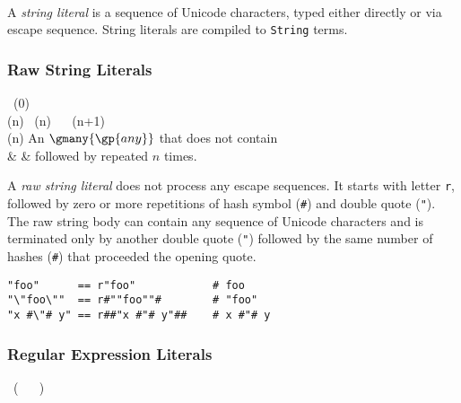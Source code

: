 \begin{bnf}
   \eq {} \  \ 
\end{bnf}

A \emph{string literal} is a sequence of Unicode characters, typed either directly or via escape sequence. String literals are compiled to \lstinline{String} terms.

\subsubsection*{Raw String Literals}

\begin{bnf}
        \eq {} \ (0) \\
  (n)  \eq    {} \ (n) \ 
                      \gorln \term{\#} \ (n+1) \ \term{\#} \\
  (n) \eq \textnormal{An \(\gmany{\gp{any}}\) that does not contain} \\
                      & & \textnormal{ followed by \term{\#} repeated \(n\) times.}
\end{bnf}

A \emph{raw string literal} does not process any escape sequences. It starts with letter \texttt{r}, followed by zero or more repetitions of hash symbol (\texttt{\#}) and double quote (\texttt{"}). The raw string body can contain any sequence of Unicode characters and is terminated only by another double quote (\texttt{"}) followed by the same number of hashes (\texttt{\#}) that proceeded the opening quote.

\begin{example}
\begin{lstlisting}[language=intentio]
"foo"      == r"foo"            # foo
"\"foo\""  == r#""foo""#        # "foo"
"x #\"# y" == r##"x #"# y"##    # x #"# y
\end{lstlisting}
\end{example}

\subsubsection*{Regular Expression Literals}

\begin{bnf}
   \eq {} \ ( \  \gor {} \ )
\end{bnf}

